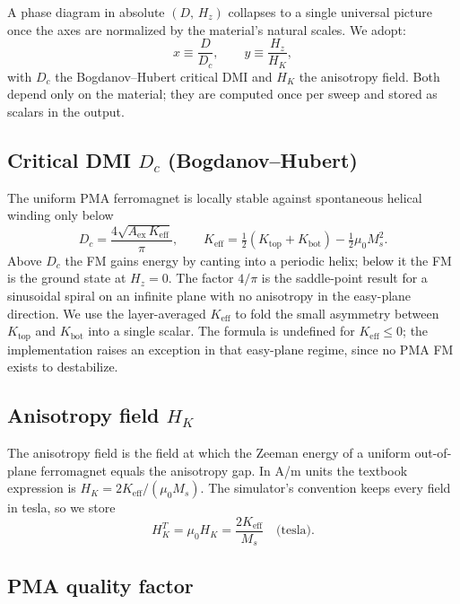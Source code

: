 \documentclass[11pt,a4paper]{article}
\newcommand{\Keff}{K_{\text{eff}}}
\newcommand{\Aex}{A_{\text{ex}}}
\newcommand{\Ms}{M_s}
\newcommand{\HK}{H_K}
\newcommand{\Dc}{D_c}
\begin{document}
A phase diagram in absolute $(D,\, H_z)$ collapses to a
single universal picture once the axes are normalized by the
material's natural scales. We adopt:
%
\begin{equation}\label{eq:reduced}
\boxed{\;
x \equiv \frac{D}{\Dc},
\qquad
y \equiv \frac{H_z}{\HK},
\;}
\end{equation}
%
with $\Dc$ the Bogdanov--Hubert critical DMI and $\HK$ the
anisotropy field. Both depend only on the material; they are
computed once per sweep and stored as scalars in the output.

\subsection{Critical DMI $\Dc$ (Bogdanov--Hubert)}

The uniform PMA ferromagnet is locally stable against
spontaneous helical winding only below
%
\begin{equation}\label{eq:Dc}
\Dc = \frac{4 \sqrt{\Aex \, \Keff}}{\pi},
\qquad
\Keff = \tfrac{1}{2}(K_{\text{top}} + K_{\text{bot}})
    - \tfrac{1}{2} \mu_0 \Ms^2.
\end{equation}
%
Above $\Dc$ the FM gains energy by canting into a
periodic helix; below it the FM is the ground state at
$H_z = 0$. The factor $4/\pi$ is the saddle-point result
for a sinusoidal spiral on an infinite plane with no
anisotropy in the easy-plane direction. We use the
layer-averaged $\Keff$ to fold the small asymmetry between
$K_{\text{top}}$ and $K_{\text{bot}}$ into a single scalar.
The formula is undefined for $\Keff \le 0$; the
implementation raises an exception in that easy-plane
regime, since no PMA FM exists to destabilize.

\subsection{Anisotropy field $\HK$}

The anisotropy field is the field at which the Zeeman
energy of a uniform out-of-plane ferromagnet equals the
anisotropy gap. In A/m units the textbook expression is
$\HK = 2 \Keff / (\mu_0 \Ms)$. The simulator's convention
keeps every field in tesla, so we store
%
\begin{equation}\label{eq:HK}
\HK^T = \mu_0 \HK = \frac{2 \Keff}{\Ms}
    \quad \text{(tesla)}.
\end{equation}

\subsection{PMA quality factor}
\end{document}

